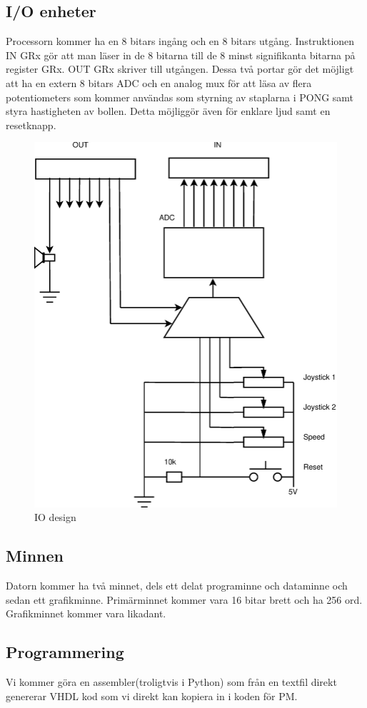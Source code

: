 \subsection{I/O enheter}
Processorn kommer ha en 8 bitars ingång och en 8 bitars utgång. Instruktionen IN GRx gör att man läser in de 8 bitarna till de 8 minst signifikanta bitarna på register GRx. OUT GRx skriver till utgången. Dessa två portar gör det möjligt att ha en extern 8 bitars ADC och en analog mux för att läsa av flera potentiometers som kommer användas som styrning av staplarna i PONG samt styra hastigheten av bollen. Detta möjliggör även för enklare ljud samt en resetknapp. 
\begin{center}
\begin{figure}[H]
    \centering
\includegraphics[scale=0.40]{../grafik/io.eps}
\caption{IO design}
\label{fig:gui}
\end{figure}
\end{center}
\subsection{Minnen}
Datorn kommer ha två minnet, dels ett delat programinne och dataminne och sedan ett grafikminne. Primärminnet kommer vara 16 bitar brett och ha 256 ord. Grafikminnet kommer vara likadant.
\subsection{Programmering}
Vi kommer göra en assembler(troligtvis i Python) som från en textfil direkt genererar VHDL kod som vi direkt kan kopiera in i koden för PM.